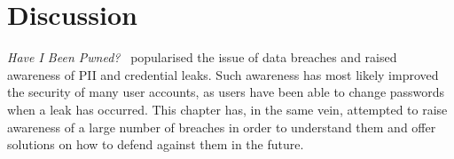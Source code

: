 %
%
%
%
%
%
%
%

\section{Discussion}
\label{sec::chp3::discussion}


\textit{Have I Been Pwned?}~\cite{haveibeenpwned} popularised the issue of data breaches and raised awareness of PII and credential leaks. Such awareness has most likely improved the security of many user accounts, as users have been able to change passwords when a leak has occurred. This chapter has, in the same vein, attempted to raise awareness of a large number of breaches in order to understand them and offer solutions on how to defend against them in the future.

